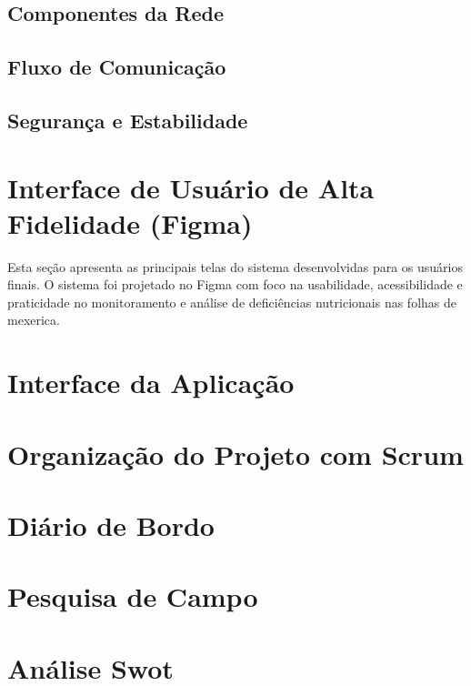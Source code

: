 \documentclass[
    a4paper,
    12pt,
    english,
    brazilian
]{article}
\begin{document}
    \subsection{\textbf{Componentes da Rede}}
    \label{sect:Componentes-da-Rede}
    

    \subsection{\textbf{Fluxo de Comunicação}}
    \label{sect:Fluxo-de-comunicacao}
    

    \subsection{\textbf{Segurança e Estabilidade}}
    \label{sect:Seguranca-e-estabilidade}
    

\section{Interface de Usuário de Alta Fidelidade (Figma)}
\medskip
Esta seção apresenta as principais telas do sistema desenvolvidas para os usuários
finais. O sistema foi projetado no Figma com foco na usabilidade, acessibilidade e praticidade no
monitoramento e análise de deficiências nutricionais nas folhas de mexerica.

\section{Interface da Aplicação}
\medskip
    \label{sect:Interface-Aplicacao}
    

\section{Organização do Projeto com Scrum}
\medskip
    \label{sect:Scrum}
    

\section{Diário de Bordo}
\medskip
    \label{sect:Diario-de-Bordo}
    

\section{Pesquisa de Campo}
\medskip
    \label{sect:Pesquisa-de-Campo}
    

\section{Análise Swot}
\medskip
    \label{sect:Analise-Swot}
    

\clearpage
\end{document}
